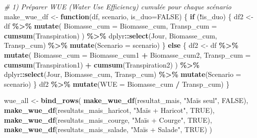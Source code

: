 \documentclass[
]{article}
\newenvironment{Shaded}{\begin{snugshade}}{\end{snugshade}}
\newcommand{\AttributeTok}[1]{\textcolor[rgb]{0.13,0.29,0.53}{#1}}
\newcommand{\CommentTok}[1]{\textcolor[rgb]{0.56,0.35,0.01}{\textit{#1}}}
\newcommand{\ConstantTok}[1]{\textcolor[rgb]{0.56,0.35,0.01}{#1}}
\newcommand{\ControlFlowTok}[1]{\textcolor[rgb]{0.13,0.29,0.53}{\textbf{#1}}}
\newcommand{\FunctionTok}[1]{\textcolor[rgb]{0.13,0.29,0.53}{\textbf{#1}}}
\newcommand{\NormalTok}[1]{#1}
\newcommand{\OtherTok}[1]{\textcolor[rgb]{0.56,0.35,0.01}{#1}}
\newcommand{\SpecialCharTok}[1]{\textcolor[rgb]{0.81,0.36,0.00}{\textbf{#1}}}
\newcommand{\StringTok}[1]{\textcolor[rgb]{0.31,0.60,0.02}{#1}}
\begin{document}
\begin{Shaded}
\begin{Highlighting}[]
\CommentTok{\# 1) Préparer WUE (Water Use Efficiency) cumulée pour chaque scénario}
\NormalTok{make\_wue\_df }\OtherTok{\textless{}{-}} \ControlFlowTok{function}\NormalTok{(df, scenario, }\AttributeTok{is\_duo=}\ConstantTok{FALSE}\NormalTok{) \{}
  \ControlFlowTok{if}\NormalTok{ (}\SpecialCharTok{!}\NormalTok{is\_duo) \{}
\NormalTok{    df2 }\OtherTok{\textless{}{-}}\NormalTok{ df }\SpecialCharTok{\%\textgreater{}\%}
      \FunctionTok{mutate}\NormalTok{(}
        \AttributeTok{Biomasse\_cum =}\NormalTok{ Biomasse\_cum,}
        \AttributeTok{Transp\_cum   =} \FunctionTok{cumsum}\NormalTok{(Transpiration)}
\NormalTok{      ) }\SpecialCharTok{\%\textgreater{}\%}
\NormalTok{      dplyr}\SpecialCharTok{::}\FunctionTok{select}\NormalTok{(Jour, Biomasse\_cum, Transp\_cum) }\SpecialCharTok{\%\textgreater{}\%}
      \FunctionTok{mutate}\NormalTok{(}\AttributeTok{Scenario =}\NormalTok{ scenario)}
\NormalTok{  \} }\ControlFlowTok{else}\NormalTok{ \{}
\NormalTok{    df2 }\OtherTok{\textless{}{-}}\NormalTok{ df }\SpecialCharTok{\%\textgreater{}\%}
      \FunctionTok{mutate}\NormalTok{(}
        \AttributeTok{Biomasse\_cum =}\NormalTok{ Biomasse\_cum1 }\SpecialCharTok{+}\NormalTok{ Biomasse\_cum2,}
        \AttributeTok{Transp\_cum   =} \FunctionTok{cumsum}\NormalTok{(Transpiration1) }\SpecialCharTok{+} \FunctionTok{cumsum}\NormalTok{(Transpiration2)}
\NormalTok{      ) }\SpecialCharTok{\%\textgreater{}\%}
\NormalTok{      dplyr}\SpecialCharTok{::}\FunctionTok{select}\NormalTok{(Jour, Biomasse\_cum, Transp\_cum) }\SpecialCharTok{\%\textgreater{}\%}
      \FunctionTok{mutate}\NormalTok{(}\AttributeTok{Scenario =}\NormalTok{ scenario)}
\NormalTok{  \}}
\NormalTok{  df2 }\SpecialCharTok{\%\textgreater{}\%}
    \FunctionTok{mutate}\NormalTok{(}\AttributeTok{WUE =}\NormalTok{ Biomasse\_cum }\SpecialCharTok{/}\NormalTok{ Transp\_cum)}
\NormalTok{\}}

\NormalTok{wue\_all }\OtherTok{\textless{}{-}} \FunctionTok{bind\_rows}\NormalTok{(}
  \FunctionTok{make\_wue\_df}\NormalTok{(resultat\_mais,               }\StringTok{"Maïs seul"}\NormalTok{,      }\ConstantTok{FALSE}\NormalTok{),}
  \FunctionTok{make\_wue\_df}\NormalTok{(resultats\_mais\_haricot,      }\StringTok{"Maïs + Haricot"}\NormalTok{, }\ConstantTok{TRUE}\NormalTok{),}
  \FunctionTok{make\_wue\_df}\NormalTok{(resultats\_mais\_courge,       }\StringTok{"Maïs + Courge"}\NormalTok{,  }\ConstantTok{TRUE}\NormalTok{),}
  \FunctionTok{make\_wue\_df}\NormalTok{(resultats\_mais\_salade,       }\StringTok{"Maïs + Salade"}\NormalTok{,  }\ConstantTok{TRUE}\NormalTok{)}
\NormalTok{)}


\end{Highlighting}
\end{Shaded}
\end{document}

